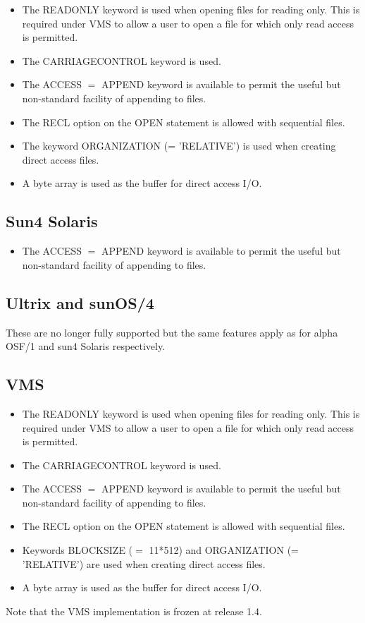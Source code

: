\documentclass[twoside,11pt,nolof]{starlink}
\begin{document}
\begin{itemize}
\item The READONLY keyword is used when opening files for reading only.
This is required under VMS to allow a user to open a file for which
only read access is permitted.
\item The CARRIAGECONTROL keyword is used.
\item The ACCESS $=$ APPEND keyword is available to permit the useful but
non-standard facility of appending to files.
\item The RECL option on the OPEN statement is allowed with sequential files.
\item The keyword ORGANIZATION (= 'RELATIVE') is used when creating direct
access files.
\item A byte array is used as the buffer for direct access I/O.
\end{itemize}

\subsection{Sun4 Solaris}

\begin{itemize}
\item The ACCESS $=$ APPEND keyword is available to permit the useful but
non-standard facility of appending to files.
\end{itemize}

\subsection{Ultrix and sunOS/4}
These are no longer fully supported but the same features apply as for alpha
OSF/1 and sun4 Solaris respectively.

\subsection{VMS}
\begin{itemize}
\item The READONLY keyword is used when opening files for reading only.
This is required under VMS to allow a user to open a file for which
only read access is permitted.
\item The CARRIAGECONTROL keyword is used.
\item The ACCESS $=$ APPEND keyword is available to permit the useful but
non-standard facility of appending to files.
\item The RECL option on the OPEN statement is allowed with sequential files.
\item Keywords BLOCKSIZE ($=$ 11*512) and ORGANIZATION (= 'RELATIVE') are used
when creating direct access files.
\item A byte array is used as the buffer for direct access I/O.
\end{itemize}
Note that the VMS implementation is frozen at release 1.4.
\end{document}
